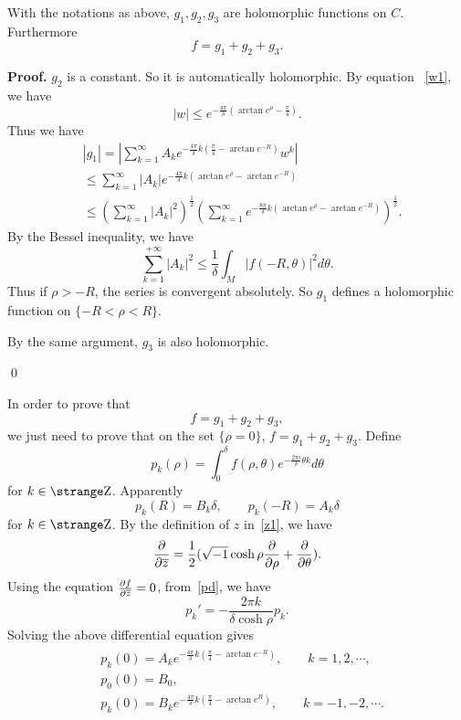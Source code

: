 \begin{lemma}\label{lem31}
With the notations as above,
$g_1,g_2,g_3$ are holomorphic functions on $C$. Furthermore
\[
f=g_1+g_2+g_3.
\]
\end{lemma}

{\bf Proof.} 
$g_2$ is a constant. So it is automatically holomorphic.
By equation ~\eqref{w1}, we have
\[
|w|\leq e^{-\frac{4\pi}{\delta}(\arctan e^\rho-\frac\pi 4)}.
\]
Thus we have
\begin{align*}
&|g_1|= |\sum_{k=1}^\infty A_ke^{-\frac{4\pi}{\delta}k(
\frac{\pi}{4}-\arctan e^{-R})} w^k|\\
&\leq\sum_{k=1}^\infty |A_k|e^{-\frac{4\pi}{\delta}k
(\arctan e^\rho-\arctan e^{-R})}\\
&\leq(\sum_{k=1}^\infty|A_k|^2)^{\frac 12}
(\sum_{k=1}^\infty e^{-\frac{8\pi}{\delta}k(\arctan e^\rho-\arctan
e^{-R})})^{\frac 12}.
\end{align*}
By the Bessel inequality,
we have
\[
\sum_{k=1}^{+\infty}|A_k|^2\leq
\frac 1\delta\int_M|f(-R,\theta)|^2 d\theta.
\]
Thus
if $\rho>-R$, the series is convergent absolutely.
So $g_1$ defines a holomorphic function on $\{-R<\rho< R\}$.

By the same argument, $g_3$ is also holomorphic.

\qed


In order to prove that 
\[
f=g_1+g_2+g_3,
\]
we just need to prove that on the set $\{\rho=0\}$, $f=g_1+g_2+g_3$.
Define
\begin{equation}\label{pd}
p_k(\rho)=\int_0^\delta f(\rho,\theta)e^{-\frac{2\pi i}{\delta}
\theta k} d\theta
\end{equation}
for $k\in\Z$.
Apparently
\[
p_k(R)=B_k\delta,\qquad p_k(-R)=A_k\delta
\]
for $k\in\Z$.
By the definition of $z$ in~\eqref{z1}, we have
\[
\frac{\partial}{\partial\overline z}=\frac 12
(\sqrt{-1}\cosh\rho\frac{\partial}{\partial\rho}+\frac{\partial}{\partial\theta}).
\]
Using the equation $\frac{\partial f}{\partial\overline z}=0$, from~\eqref{pd},
we have
\[
p_k'=-\frac{2\pi k}{\delta\cosh\rho}p_k.
\]
Solving the above differential equation gives 
\begin{align}\label{p}
\begin{split}
&p_k(0)=A_ke^{-\frac{4\pi}{\delta}k(\frac\pi 4-\arctan e^{-R})},
\qquad  k=1,2,\cdots,\\
& p_0(0)=B_0,\\
& p_k(0)=B_k e^{-\frac{4\pi}{\delta}k(\frac\pi 4-\arctan e^R)},
\qquad k=-1,-2,\cdots.
\end{split}
\end{align}

